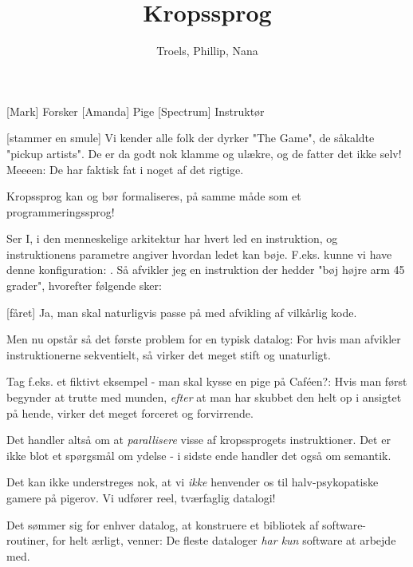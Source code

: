 \documentclass[a4paper,11pt]{article}
\title{Kropssprog}
\author{Troels, Phillip, Nana}
\begin{document}
\maketitle
\begin{roles}
  [Mark] Forsker
  [Amanda] Pige
  [Spectrum] Instruktør
\end{roles}
\begin{sketch}


[stammer en smule] Vi kender alle folk der dyrker "The Game",
de såkaldte "pickup artists". De er da godt nok klamme og ulækre, og
de fatter det ikke selv! Meeeen: De har faktisk fat i noget af det
rigtige.

 Kropssprog kan og bør formaliseres, på samme måde som et
programmeringssprog!

 Ser I, i den menneskelige arkitektur har hvert led en
instruktion, og instruktionens parametre angiver hvordan ledet kan
bøje. F.eks. kunne vi have denne konfiguration: . Så afvikler jeg en instruktion der hedder
"bøj højre arm 45 grader", hvorefter følgende sker:


[fåret] Ja, man skal naturligvis passe på med afvikling af
vilkårlig kode.

 Men nu opstår så det første problem for en typisk datalog:
For hvis man afvikler instruktionerne sekventielt, så virker det meget
stift og unaturligt.

 Tag f.eks. et fiktivt eksempel - man skal kysse en pige på
Caféen?: Hvis man først begynder at trutte med munden, \textit{efter}
at man har skubbet den helt op i ansigtet på hende, virker det meget
forceret og forvirrende.

 Det handler altså om at \textit{parallisere} visse af
kropssprogets instruktioner. Det er ikke blot et spørgsmål om ydelse -
i sidste ende handler det også om semantik.

 Det kan ikke understreges nok, at vi \textit{ikke} henvender
os til halv-psykopatiske gamere på pigerov. Vi udfører reel,
tværfaglig datalogi!

 Det sømmer sig for enhver datalog, at konstruere et bibliotek
af software-routiner, for helt ærligt, venner: De fleste dataloger
\textit{har kun} software at arbejde med.


\end{sketch}
\end{document}
